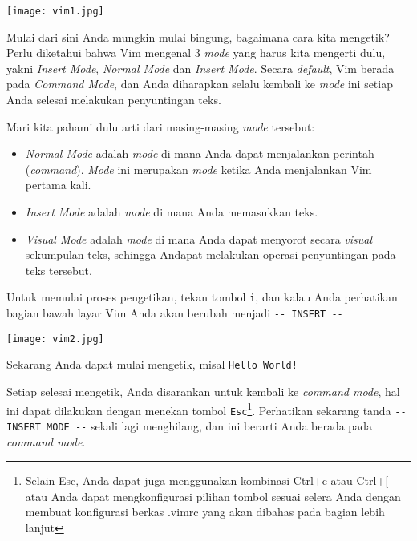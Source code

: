 \documentclass{article}
\begin{document}
\vspace{12pt}

\texttt{[image: vim1.jpg]}

\vspace{12pt}

Mulai dari sini Anda mungkin mulai bingung, bagaimana cara
kita mengetik? Perlu diketahui bahwa Vim mengenal 3
\emph{mode} yang harus kita mengerti dulu, yakni
\emph{Insert Mode}, \emph{Normal Mode} dan 
\emph{Insert Mode}. Secara \emph{default}, Vim berada pada
\emph{Command Mode}, dan Anda diharapkan selalu kembali ke
\emph{mode} ini setiap Anda selesai melakukan penyuntingan
teks. 

Mari kita pahami dulu arti dari masing-masing \emph{mode}
tersebut:

\begin{itemize}
    \item \emph{Normal Mode} adalah \emph{mode} di mana Anda
        dapat menjalankan perintah (\emph{command}). 
        \emph{Mode} ini merupakan \emph{mode} ketika Anda
        menjalankan Vim pertama kali.
    \item \emph{Insert Mode} adalah \emph{mode} di mana Anda
        memasukkan teks.
    \item \emph{Visual Mode} adalah \emph{mode} di mana Anda
        dapat menyorot secara \emph{visual} sekumpulan teks,
        sehingga Andapat melakukan operasi penyuntingan pada
        teks tersebut.
\end{itemize}

Untuk memulai proses pengetikan, tekan tombol \verb=i=, dan
kalau Anda perhatikan bagian bawah layar Vim Anda akan
berubah menjadi \verb=-- INSERT --=

\vspace{12pt}

\texttt{[image: vim2.jpg]}

\vspace{12pt}

Sekarang Anda dapat mulai mengetik, misal \verb=Hello World!=

Setiap selesai mengetik, Anda disarankan untuk kembali ke
\emph{command mode}, hal ini dapat dilakukan dengan menekan
tombol \verb=Esc=\footnote{Selain Esc, Anda dapat juga
    menggunakan kombinasi Ctrl+c atau Ctrl+[ atau Anda dapat
    mengkonfigurasi pilihan tombol sesuai selera Anda dengan
membuat konfigurasi berkas .vimrc yang akan dibahas pada
bagian lebih lanjut}. Perhatikan sekarang tanda 
\verb=-- INSERT MODE --= sekali lagi menghilang, dan ini
berarti Anda berada pada \emph{command mode}. 
\end{document}
